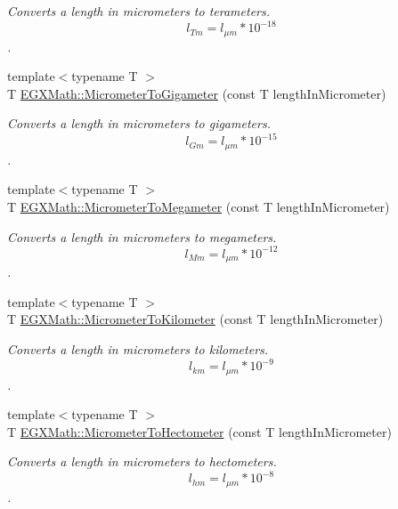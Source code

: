 \begin{DoxyCompactItemize}
\begin{DoxyCompactList}\small\item\em Converts a length in micrometers to terameters. \[ l_{Tm}=l_{\mu m} * 10^{-18} \]. \end{DoxyCompactList}\item 
{\footnotesize template$<$typename T $>$ }\\T \mbox{\hyperlink{group___e_g_x_math-_conversions-_length_conversions-_s_i-_micrometer-_s_i_ga1c29c4f00b8375c21196ac347b030929}{E\+G\+X\+Math\+::\+Micrometer\+To\+Gigameter}} (const T length\+In\+Micrometer)
\begin{DoxyCompactList}\small\item\em Converts a length in micrometers to gigameters. \[ l_{Gm}=l_{\mu m} * 10^{-15} \]. \end{DoxyCompactList}\item 
{\footnotesize template$<$typename T $>$ }\\T \mbox{\hyperlink{group___e_g_x_math-_conversions-_length_conversions-_s_i-_micrometer-_s_i_ga95c97884708f4bdf027349dc7535c097}{E\+G\+X\+Math\+::\+Micrometer\+To\+Megameter}} (const T length\+In\+Micrometer)
\begin{DoxyCompactList}\small\item\em Converts a length in micrometers to megameters. \[ l_{Mm}=l_{\mu m} * 10^{-12} \]. \end{DoxyCompactList}\item 
{\footnotesize template$<$typename T $>$ }\\T \mbox{\hyperlink{group___e_g_x_math-_conversions-_length_conversions-_s_i-_micrometer-_s_i_ga50cbd73dda2b126fc5b4425ee80cb3fb}{E\+G\+X\+Math\+::\+Micrometer\+To\+Kilometer}} (const T length\+In\+Micrometer)
\begin{DoxyCompactList}\small\item\em Converts a length in micrometers to kilometers. \[ l_{km}=l_{\mu m} * 10^{-9} \]. \end{DoxyCompactList}\item 
{\footnotesize template$<$typename T $>$ }\\T \mbox{\hyperlink{group___e_g_x_math-_conversions-_length_conversions-_s_i-_micrometer-_s_i_ga49b0782446259c1f19927b5ecaff2f12}{E\+G\+X\+Math\+::\+Micrometer\+To\+Hectometer}} (const T length\+In\+Micrometer)
\begin{DoxyCompactList}\small\item\em Converts a length in micrometers to hectometers. \[ l_{hm}=l_{\mu m} * 10^{-8} \]. \end{DoxyCompactList}\item 

\end{DoxyCompactItemize}
